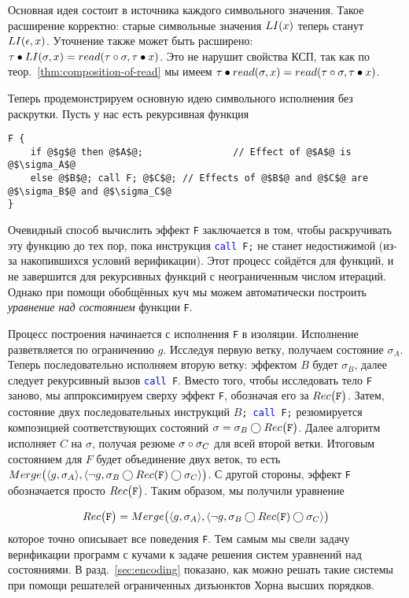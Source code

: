 %
Основная идея состоит в  источника каждого символьного значения. Такое расширение корректно: старые символьные значения $LI(x)$ теперь станут $LI(\epsilon, x)$. Уточнение также может быть расширено: $\tau\bullet LI(\sigma, x)=read(\tau\circ\sigma,\tau\bullet x)$. Это не нарушит свойства КСП, так как по теор.~\ref{thm:composition-of-read} мы имеем $\tau\bullet read(\sigma,x)=read(\tau\circ\sigma,\tau\bullet x)$.

Теперь продемонстрируем основную идею символьного исполнения без раскрутки. Пусть у нас есть рекурсивная функция
%
\begin{lstlisting}[style=demolang]
F {
	if @$g$@ then @$A$@;				// Effect of @$A$@ is @$\sigma_A$@
	else @$B$@; call F; @$C$@; // Effects of @$B$@ and @$C$@ are @$\sigma_B$@ and @$\sigma_C$@
}
\end{lstlisting}

Очевидный способ вычислить эффект \texttt{F} заключается в том, чтобы раскручивать эту функцию до тех пор, пока инструкция \texttt{\textcolor{blue}{call} F;} не станет недостижимой (из-за накопившихся условий верификации). Этот процесс сойдётся для  функций, и не завершится для рекурсивных функций с неограниченным числом итераций. Однако при помощи обобщённых куч мы можем автоматически построить \emph{уравнение над состоянием} функции \texttt{F}.

Процесс построения начинается с исполнения \texttt{F} в изоляции. Исполнение разветвляется по ограничению $g$. Исследуя первую ветку, получаем состояние $\sigma_A$. Теперь последовательно исполняем вторую ветку: эффектом $B$ будет $\sigma_B$, далее следует рекурсивный вызов \texttt{\textcolor{blue}{call} F}. Вместо того, чтобы исследовать тело \texttt{F} заново, мы аппроксимируем сверху эффект \texttt{F}, обозначая его за $Rec\big(\texttt{F}\big)$. Затем, состояние двух последовательных инструкций \texttt{$B$; \textcolor{blue}{call} F;} резюмируется композицией соответствующих состояний $\sigma = \sigma_B\bigcirc Rec\big(\texttt{F}\big)$. Далее алгоритм исполняет $C$ на $\sigma$, получая резюме $\sigma\circ\sigma_C$ для всей второй ветки. Итоговым состоянием для $F$ будет объединение двух веток, то есть $Merge\big(\langle g, \sigma_A\rangle, \langle\neg g, \sigma_B\bigcirc Rec(\texttt{F})\bigcirc\sigma_C\rangle\big)$. С другой стороны, эффект \texttt{F} обозначается просто $Rec\big(\texttt{F}\big)$. Таким образом, мы получили уравнение

\begin{align*}
Rec\big(\texttt{F}\big)=Merge\big(\langle g, \sigma_A\rangle, \langle\neg g, \sigma_B\bigcirc Rec(\texttt{F})\bigcirc\sigma_C\rangle\big)
\end{align*}
%
которое точно описывает все поведения \texttt{F}. Тем самым мы свели задачу верификации программ с кучами к задаче решения систем уравнений над состояниями. В разд.~\ref{sec:encoding} показано, как можно решать такие системы при помощи решателей ограниченных дизъюнктов Хорна высших порядков.

